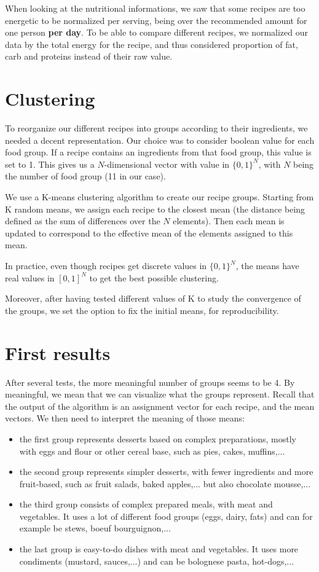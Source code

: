 \documentclass[11pt]{article}
\begin{document}
When looking at the nutritional informations, we saw that some recipes are too energetic to be normalized per serving, being over the recommended amount for one person \textbf{per day}. To be able to compare different recipes, we normalized our data by the total energy for the recipe, and thus considered proportion of fat, carb and proteins instead of their raw value.

\section{Clustering}
To reorganize our different recipes into groups according to their ingredients, we needed a decent representation. Our choice was to consider boolean value for each food group. If a recipe contains an ingredients from that food group, this value is set to 1. This gives us a $N$-dimensional vector with value in $\{0,1\}^{N}$, with $N$ being the number of food group (11 in our case).

We use a K-means clustering algorithm to create our recipe groups. Starting from K random means, we assign each recipe to the closest mean (the distance being defined as the sum of differences over the $N$ elements). Then each mean is updated to correspond to the effective mean of the elements assigned to this mean.

In practice, even though recipes get discrete values in $\{0,1\}^{N}$, the means have real values in $[0,1]^{N}$ to get the best possible clustering.

Moreover, after having tested different values of K to study the convergence of the groups, we set the option to fix the initial means, for reproducibility.

\section{First results}
After several tests, the more meaningful number of groups seems to be 4. By meaningful, we mean that we can visualize what the groups represent. Recall that the output of the algorithm is an assignment vector for each recipe, and the mean vectors. We then need to interpret the meaning of those means:

\begin{itemize}
\item the first group represents desserts based on complex preparations, mostly with eggs and flour or other cereal base, such as pies, cakes, muffins,...
\item the second group represents simpler desserts, with fewer ingredients and more fruit-based, such as fruit salads, baked apples,... but also chocolate mousse,...
\item the third group consists of complex prepared meals, with meat and vegetables. It uses a lot of different food groups (eggs, dairy, fats) and can for example be stews, boeuf bourguignon,...
\item the last group is easy-to-do dishes with meat and vegetables. It uses more condiments (mustard, sauces,...) and can be bolognese pasta, hot-dogs,...
\end{itemize}
\end{document}
